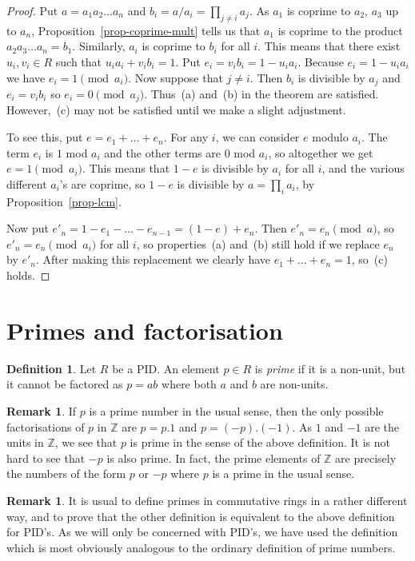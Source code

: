 \documentclass{amsart}
\newcommand{\Z}         {{\mathbb{Z}}}
\renewcommand{\:}{\colon}
\theoremstyle{definition}
\newtheorem{remark}[theorem]{Remark}
\newtheorem{definition}[theorem]{Definition}
\begin{document}
\begin{proof}
 Put $a=a_1a_2\ldots a_n$ and $b_i=a/a_i=\prod_{j\neq i}a_j$.  As
 $a_1$ is coprime to $a_2$, $a_3$ up to $a_n$,
 Proposition~\ref{prop-coprime-mult} tells us that $a_1$ is coprime to
 the product $a_2a_3\ldots a_n=b_1$.  Similarly, $a_i$ is coprime to
 $b_i$ for all $i$. This means that there exist $u_i,v_i\in R$ such
 that $u_ia_i+v_ib_i=1$.  Put $e_i=v_ib_i=1-u_ia_i$.  Because
 $e_i=1-u_ia_i$ we have $e_i=1\pmod{a_i}$.  Now suppose that $j\neq
 i$.  Then $b_i$ is divisible by $a_j$ and $e_i=v_ib_i$ so
 $e_i=0\pmod{a_j}$.  Thus~(a) and~(b) in the theorem are satisfied.
 However,~(c) may not be satisfied until we make a slight adjustment.

 To see this, put $e=e_1+\ldots+e_n$.  For any $i$, we can consider
 $e$ modulo $a_i$.  The term $e_i$ is $1$ mod $a_i$ and the other
 terms are $0$ mod $a_i$, so altogether we get $e=1\pmod{a_i}$.  This
 means that $1-e$ is divisible by $a_i$ for all $i$, and the various
 different $a_i$'s are coprime, so $1-e$ is divisible by
 $a=\prod_ia_i$, by Proposition~\ref{prop-lcm}.

 Now put $e'_n=1-e_1-\ldots-e_{n-1}=(1-e)+e_n$.  Then
 $e'_n=e_n\pmod{a}$, so $e'_n=e_n\pmod{a_i}$ for all $i$, so
 properties~(a) and~(b) still hold if we replace $e_n$ by $e'_n$.
 After making this replacement we clearly have $e_1+\ldots+e_n=1$,
 so~(c) holds.  
\end{proof}

\section{Primes and factorisation}

\begin{definition}
 Let $R$ be a PID.  An element $p\in R$ is \emph{prime} if it is a
 non-unit, but it cannot be factored as $p=ab$ where both $a$ and $b$
 are non-units.
\end{definition}
\begin{remark}
 If $p$ is a prime number in the usual sense, then the only possible
 factorisations of $p$ in $\Z$ are $p=p.1$ and $p=(-p).(-1)$.  As $1$
 and $-1$ are the units in $\Z$, we see that $p$ is prime in the sense
 of the above definition.  It is not hard to see that $-p$ is also
 prime.  In fact, the prime elements of $\Z$ are precisely the numbers
 of the form $p$ or $-p$ where $p$ is a prime in the usual sense.
\end{remark}
\begin{remark}
 It is usual to define primes in commutative rings in a rather
 different way, and to prove that the other definition is equivalent
 to the above definition for PID's.  As we will only be concerned with
 PID's, we have used the definition which is most obviously analogous
 to the ordinary definition of prime numbers.
\end{remark}
\end{document}
